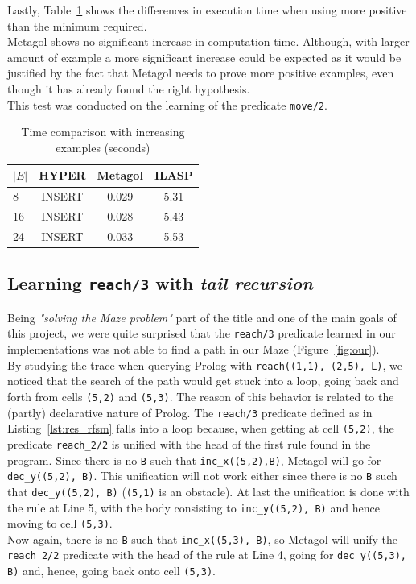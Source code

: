 Lastly, Table~\ref{tab:ex_cmp} shows the differences in execution time when using more positive than the minimum required.\\
Metagol shows no significant increase in computation time. Although, with larger amount of example a more significant increase could be expected as it would be justified by the fact that Metagol needs to prove more positive examples, even though it has already
found the right hypothesis.\\
This test was conducted on the learning of the predicate \texttt{move/2}.

{
\begin{center}
    \begin{table}[h]
    \centering
    \begin{tabular}{ |l|c|c|c| } 
        \hline
        \(|E|\) & \textbf{HYPER} & \textbf{Metagol} & \textbf{ILASP} \\ \hline
        8 & INSERT & 0.029 & 5.31 \\ 
        16 & INSERT & 0.028 & 5.43 \\
        24 & INSERT & 0.033 & 5.53 \\  
        \hline
    \end{tabular}
    \caption{\label{tab:ex_cmp}Time comparison with increasing examples (seconds)}
\end{table}
\end{center}
}

\subsection{Learning \texttt{reach/3} with \emph{tail recursion}}
Being \emph{"solving the Maze problem"} part of the title and one of the main goals of this project, we were
quite surprised that the \texttt{reach/3} predicate learned in our implementations was not able to find a path
in our Maze (Figure~\ref{fig:our}).\\
By studying the trace when querying Prolog with \texttt{reach((1,1), (2,5), L)},
we noticed that the search of the path would get stuck into a loop, going back and forth from cells \texttt{(5,2)} and
\texttt{(5,3)}. The reason of this behavior is related to the (partly) declarative nature of Prolog. The \texttt{reach/3}
predicate defined as in Listing~\ref{lst:res_rfsm} falls into a loop because, when getting at cell \texttt{(5,2)},
the predicate \texttt{reach\_2/2} is unified with the head of the first rule found in the program. Since there is
no \texttt{B} such that \texttt{inc\_x((5,2),B)}, Metagol will go for \texttt{dec\_y((5,2), B)}. This unification
will not work either since there is no \texttt{B} such that \texttt{dec\_y((5,2), B)} (\texttt{(5,1)} is an obstacle). At
last the unification is done with the rule at Line 5, with the body consisting to \texttt{inc\_y((5,2), B)} and hence moving
to cell \texttt{(5,3)}.\\
Now again, there is no \texttt{B} such that \texttt{inc\_x((5,3), B)}, so Metagol will unify the
\texttt{reach\_2/2} predicate with the head of the rule at Line 4, going for \texttt{dec\_y((5,3), B)} and, hence,
going back onto cell \texttt{(5,3)}.\\

